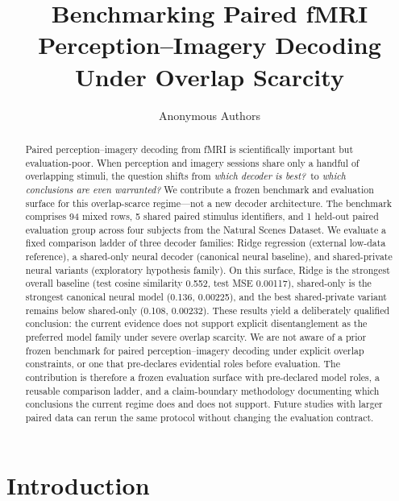 \documentclass{article}
\title{Benchmarking Paired fMRI Perception--Imagery Decoding\\Under Overlap Scarcity}
\author{Anonymous Authors}
\begin{document}
\maketitle

\begin{abstract}
Paired perception--imagery decoding from fMRI is scientifically important but
evaluation-poor.  When perception and imagery sessions share only a handful of
overlapping stimuli, the question shifts from \emph{which decoder is best?}\ to
\emph{which conclusions are even warranted?}  We contribute a frozen benchmark
and evaluation surface for this overlap-scarce regime---not a new decoder
architecture.  The benchmark comprises 94 mixed rows, 5 shared paired stimulus
identifiers, and 1 held-out paired evaluation group across four subjects from
the Natural Scenes Dataset.  We evaluate a fixed comparison ladder of three
decoder families: Ridge regression (external low-data reference), a shared-only
neural decoder (canonical neural baseline), and shared-private neural variants
(exploratory hypothesis family).  On this surface, Ridge is the strongest
overall baseline (test cosine similarity 0.552, test MSE 0.00117), shared-only
is the strongest canonical neural model (0.136, 0.00225), and the best
shared-private variant remains below shared-only (0.108, 0.00232).  These
results yield a deliberately qualified conclusion: the current evidence does not
support explicit disentanglement as the preferred model family under severe
overlap scarcity.  We are not aware of a prior frozen benchmark for paired
perception--imagery decoding under explicit overlap constraints, or one that
pre-declares evidential roles before evaluation.  The contribution is therefore
a frozen evaluation surface with pre-declared model roles, a reusable
comparison ladder, and a claim-boundary methodology documenting which
conclusions the current regime does and does not support.  Future studies with
larger paired data can rerun the same protocol without changing the evaluation
contract.
\end{abstract}

\section{Introduction}
\end{document}
